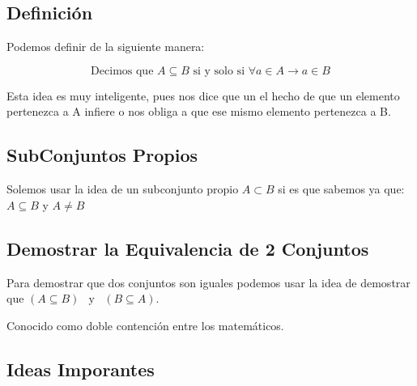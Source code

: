 \documentclass[12pt, fleqn]{report}                             %
\DeclareMathOperator \Space {\quad}                             %
\DeclareMathOperator \MiniSpace {\;}                            %
\newcommand \Also {\MiniSpace \text{y} \MiniSpace}              %
\newcommand \longto {\longrightarrow}                           %
\begin{document}
            \subsection*{Definición}

                Podemos definir de la siguiente manera:

                \begin{equation}
                    \text{Decimos que }
                    A \subseteq B 
                    \text{ si y solo si }
                    \forall a \in A \longto a \in B
                \end{equation}

                Esta idea es muy inteligente, pues nos dice que un el hecho de que
                un elemento pertenezca a A infiere o nos obliga a que ese mismo
                elemento pertenezca a B.

            \subsection{SubConjuntos Propios}

                Solemos usar la idea de un subconjunto propio $A \subset B$ si es que sabemos ya que:
                $A \subseteq B$ y $A \neq B$


            \subsection{Demostrar la Equivalencia de 2 Conjuntos}

                Para demostrar que dos conjuntos son iguales podemos usar la idea de
                demostrar que $(A \subseteq B ) \Also (B \subseteq A)$.

                Conocido como doble contención entre los matemáticos.


            \clearpage
            \subsection{Ideas Imporantes}
\end{document}
